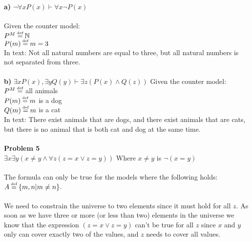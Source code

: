 \documentclass[12pt,oneside,reqno]{amsart}
\begin{document}
\textbf{a) }$\neg \forall x P(x) \vdash \forall x \neg P(x)$\\\\
Given the counter model:\\
$P^M \deff \mathbb{N}$\\
$P(m) \deff m=3$\\
In text: Not all natural numbers are equal to three, but all natural numbers is not separated from three.\\\\
\textbf{b) }$\exists x P(x), \exists y Q(y) \vdash \exists z(P(x) \land Q(z))$
Given the counter model:\\
$P^M \deff$ all animals\\
$P(m) \deff m$ is a dog\\
$Q(m) \deff m$ is a cat\\
In text: There exist animals that are dogs, and there exist animals that are cats, but there is no animal that is both cat and dog at the same time.\\\\
\textbf{Problem 5}\\
$\exists x \exists y (x\not= y \land \forall z (z=x \lor z=y))$ Where $x\not=y$ is $\neg(x=y)$\\\\
The formula can only be true for the models where the following holds:\\
$A \deff \{m,n | m\not=n \}$.\\\\
We need to constrain the universe to two elements since it must hold for all $z$. As soon as we have three or more (or less than two) elements in the universe we know that the expression $(z=x \lor z=y)$ can't be true for all $z$ since $x$ and $y$ only can cover exactly two of the values, and $z$ needs to cover all values.
\end{document}
